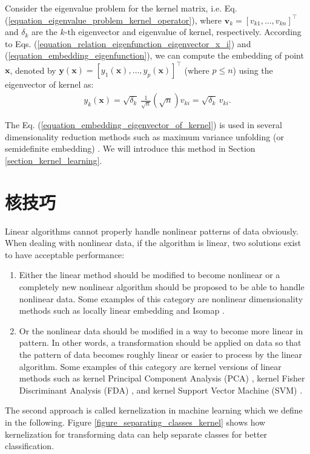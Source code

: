\documentclass[lang=cn,10pt]{gorgeousnbook}
\numberwithin{equation}{section}%
\numberwithin{figure}{section}%
\begin{document}
\begin{corollary}
Consider the eigenvalue problem for the kernel matrix, i.e. Eq. (\ref{equation_eigenvalue_problem_kernel_operator}), where $\boldsymbol{v}_k = [v_{k1}, \dots, v_{kn}]^\top$ and $\delta_k$ are the $k$-th eigenvector and eigenvalue of kernel, respectively. According to Eqs. (\ref{equation_relation_eigenfunction_eigenvector_x_i}) and (\ref{equation_embedding_eigenfunction}), we can compute the embedding of point $\boldsymbol{x}$, denoted by $\boldsymbol{y}(\boldsymbol{x}) = [y_1(\boldsymbol{x}), \dots, y_p(\boldsymbol{x})]^\top$ (where $p \leq n$) using the eigenvector of kernel as:
\begin{align}\label{equation_embedding_eigenvector_of_kernel}
y_k(\boldsymbol{x}) = \sqrt{\delta_k}\, \frac{1}{\sqrt{n}} (\sqrt{n}) v_{ki} = \sqrt{\delta_k}\, v_{ki}. 
\end{align}
\end{corollary}
The Eq. (\ref{equation_embedding_eigenvector_of_kernel}) is used in several dimensionality reduction methods such as maximum variance unfolding (or semidefinite embedding) \cite{weinberger2005nonlinear,weinberger2006unsupervised,weinberger2006introduction}. We will introduce this method in Section \ref{section_kernel_learning}. 

\section{核技巧}\label{section_kernelization_techniques}

Linear algorithms cannot properly handle nonlinear patterns of data obviously. 
When dealing with nonlinear data, if the algorithm is linear, two solutions exist to have acceptable performance:
\begin{enumerate}
\item Either the linear method should be modified to become nonlinear or a completely new nonlinear algorithm should be proposed to be able to handle nonlinear data. Some examples of this category are nonlinear dimensionality methods such as locally linear embedding \cite{ghojogh2020locally} and Isomap \cite{ghojogh2020multidimensional}. 
\item Or the nonlinear data should be modified in a way to become more linear in pattern. In other words, a transformation should be applied on data so that the pattern of data becomes roughly linear or easier to process by the linear algorithm. Some examples of this category are kernel versions of linear methods such as kernel Principal Component Analysis (PCA) \cite{scholkopf1997kernel,scholkopf1998nonlinear,ghojogh2019unsupervised}, kernel Fisher Discriminant Analysis (FDA) \cite{mika1999fisher,ghojogh2019fisher}, and kernel Support Vector Machine (SVM) \cite{boser1992training,vapnik1995nature}. 
\end{enumerate}
The second approach is called kernelization in machine learning which we define in the following. 
Figure \ref{figure_separating_classes_kernel} shows how kernelization for transforming data can help separate classes for better classification. 
\end{document}
